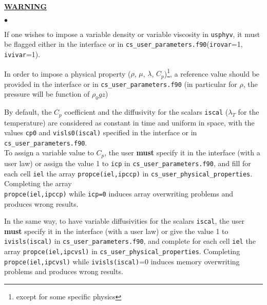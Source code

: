 {{{{\bf \underline{WARNING}}\label{prg_propvar}%
\begin{list}{$\bullet$}{}
\item If one wishes to impose a variable density or variable viscosity in
      \texttt{usphyv}, it must be flagged either in the interface or in
      \texttt{cs\_user\_parameters.f90}(\texttt{irovar}=1, \texttt{ivivar}=1).
\item In order to impose a physical property ($\rho$, $\mu$,
      $\lambda$, $C_p$)\footnote{except for some specific physics}, a reference
      value should be provided in the interface or in \texttt{cs\_user\_parameters.f90} (in
      particular for $\rho$, the pressure will be function of $\rho_0 gz$)
\item By default, the $C_p$ coefficient and the
      diffusivity for the scalars \texttt{iscal} ($\lambda_T$ for the
      temperature) are considered as constant in time and uniform in
      space, with the values \texttt{cp0} and \texttt{visls0(iscal)}
      specified in the interface or in \texttt{cs\_user\_parameters.f90}.\\
To assign a variable value to $C_p$, the user \textbf{must} specify it in the
      interface (with a user law) or assign the value 1 to \texttt{icp} in \texttt{cs\_user\_parameters.f90},
      and fill for each cell \texttt{iel} the array
      \texttt{propce(iel,ipccp)} in \texttt{cs\_user\_physical\_properties}. Completing the array
      \\\texttt{propce(iel,ipccp)} while \texttt{icp=0} induces array
      overwriting problems and produces wrong results.

\item In the same way, to have variable diffusivities for the scalars
      \texttt{iscal}, the user \textbf{must} specify it in the interface (with a user law) or give the value
      1 to \texttt{ivisls(iscal)} in \texttt{cs\_user\_parameters.f90}, and complete for each cell
      \texttt{iel} the array \texttt{propce(iel,ipcvsl)} in \texttt{cs\_user\_physical\_properties}.
      Completing \texttt{propce(iel,ipcvsl)} while \texttt{ivisls(iscal)}=0
      induces memory overwriting problems and produces wrong results.\\


\end{list}}}}
